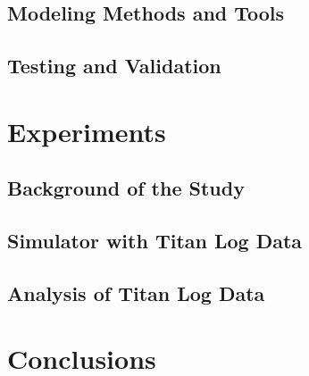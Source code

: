 \documentclass[twocolumn]{svjour3}           %
\begin{document}
\subsection{Modeling Methods and Tools}
\label{sec-strategy-2}


\subsection{Testing and Validation}
\label{sec-strategy-3}



\section{Experiments}
\label{sec-experiments}

\subsection{Background of the Study}
\label{sec-experiments-1}


\subsection{Simulator with Titan Log Data}
\label{sec-experiments-2}


\subsection{Analysis of Titan Log Data}
\label{sec-experiments-3}



\section{Conclusions}
\label{sec-conclusions}



\begin{acknowledgements}

\end{acknowledgements}



\begin{thebibliography}{}

\end{thebibliography}

\clearpage
\appendix

\end{document}
